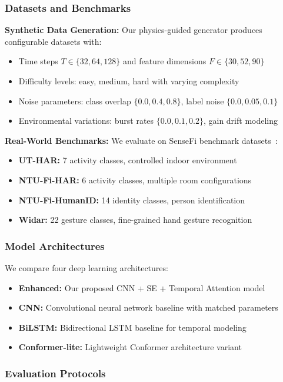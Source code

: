 \documentclass[journal]{IEEEtran}
\begin{document}
\subsubsection{Datasets and Benchmarks}

\textbf{Synthetic Data Generation:} Our physics-guided generator produces configurable datasets with:
\begin{itemize}
\item Time steps $T \in \{32, 64, 128\}$ and feature dimensions $F \in \{30, 52, 90\}$
\item Difficulty levels: easy, medium, hard with varying complexity
\item Noise parameters: class overlap $\{0.0, 0.4, 0.8\}$, label noise $\{0.0, 0.05, 0.1\}$
\item Environmental variations: burst rates $\{0.0, 0.1, 0.2\}$, gain drift modeling
\end{itemize}

\textbf{Real-World Benchmarks:} We evaluate on SenseFi benchmark datasets~\cite{yang2023sensefi}:
\begin{itemize}
\item \textbf{UT-HAR:} 7 activity classes, controlled indoor environment
\item \textbf{NTU-Fi-HAR:} 6 activity classes, multiple room configurations
\item \textbf{NTU-Fi-HumanID:} 14 identity classes, person identification
\item \textbf{Widar:} 22 gesture classes, fine-grained hand gesture recognition
\end{itemize}

\subsubsection{Model Architectures}

We compare four deep learning architectures:
\begin{itemize}
\item \textbf{Enhanced:} Our proposed CNN + SE + Temporal Attention model
\item \textbf{CNN:} Convolutional neural network baseline with matched parameters
\item \textbf{BiLSTM:} Bidirectional LSTM baseline for temporal modeling
\item \textbf{Conformer-lite:} Lightweight Conformer architecture variant
\end{itemize}

\subsubsection{Evaluation Protocols}
\end{document}
